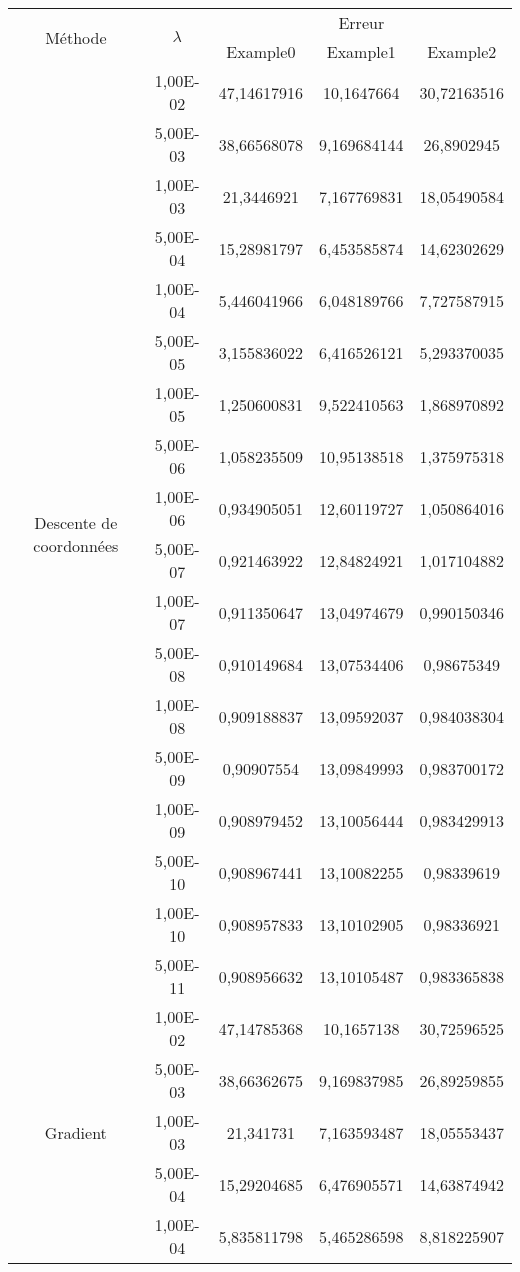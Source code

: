 \documentclass[12pt, a4paper]{report}
\begin{document}
\begin{center}
\begin{tabular}{|c|c|c|c|c|}
\hline
\multirow{2}{*}{Méthode} & \multirow{2}{*}{$\lambda$} & \multicolumn{3}{|c|}{Erreur} \\\cline{3-5}
 & & Example0 & Example1 & Example2 \\
 \hline
\multirow{18}{*}{Descente de coordonnées} & 1,00E-02 & 47,14617916 & 10,1647664 & 30,72163516 \\
 & 5,00E-03 & 38,66568078 & 9,169684144 & 26,8902945 \\
 & 1,00E-03 & 21,3446921 & 7,167769831 & 18,05490584 \\
 & 5,00E-04 & 15,28981797 & 6,453585874 & 14,62302629 \\
 & 1,00E-04 & 5,446041966 & 6,048189766 & 7,727587915 \\
 & 5,00E-05 & 3,155836022 & 6,416526121 & 5,293370035 \\
 & 1,00E-05 & 1,250600831 & 9,522410563 & 1,868970892 \\
 & 5,00E-06 & 1,058235509 & 10,95138518 & 1,375975318 \\
 & 1,00E-06 & 0,934905051 & 12,60119727 & 1,050864016 \\
 & 5,00E-07 & 0,921463922 & 12,84824921 & 1,017104882 \\
 & 1,00E-07 & 0,911350647 & 13,04974679 & 0,990150346 \\
 & 5,00E-08 & 0,910149684 & 13,07534406 & 0,98675349 \\
 & 1,00E-08 & 0,909188837 & 13,09592037 & 0,984038304 \\
 & 5,00E-09 & 0,90907554 & 13,09849993 & 0,983700172 \\
 & 1,00E-09 & 0,908979452 & 13,10056444 & 0,983429913 \\
 & 5,00E-10 & 0,908967441 & 13,10082255 & 0,98339619 \\
 & 1,00E-10 & 0,908957833 & 13,10102905 & 0,98336921 \\
 & 5,00E-11 & 0,908956632 & 13,10105487 & 0,983365838 \\
\hline
\multirow{18}{*}{Gradient} & 1,00E-02 & 47,14785368 & 10,1657138 & 30,72596525 \\
 & 5,00E-03 & 38,66362675 & 9,169837985 & 26,89259855 \\
 & 1,00E-03 & 21,341731 & 7,163593487 & 18,05553437 \\
 & 5,00E-04 & 15,29204685 & 6,476905571 & 14,63874942 \\
 & 1,00E-04 & 5,835811798 & 5,465286598 & 8,818225907 \\

\end{tabular}
\end{center}
\end{document}
